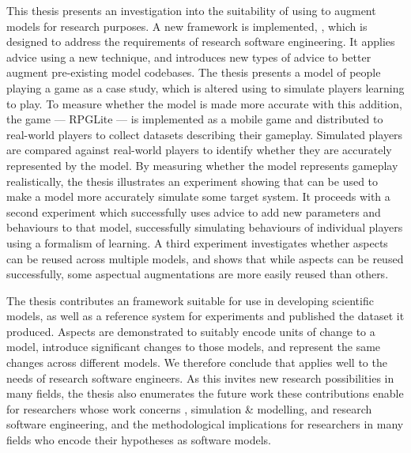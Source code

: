     This thesis presents an investigation into the suitability of using \aop{}
    to augment models for research purposes. A new \aspectorientation{}
    framework is implemented, \pdsf{}, which is designed to address the
    requirements of research software engineering. It applies advice  using a new
    technique, and introduces new types of advice to better augment pre-existing
    model codebases. The thesis presents a model of people playing a game as a
    case study, which is altered using \pdsf{} to simulate players learning to
    play. To measure whether the model is made more accurate with this addition,
    the game --- RPGLite --- is implemented as a mobile game and distributed to
    real-world players to collect datasets describing their gameplay. Simulated
    players are compared against real-world players to identify whether they are
    accurately represented by the model. By measuring whether the model
    represents gameplay realistically, the thesis illustrates an experiment
    showing that \aop{} can be used to make a model more accurately simulate
    some target system. It proceeds with a second experiment which successfully
    uses advice to add new parameters and behaviours to that model, successfully
    simulating behaviours of individual players using a formalism of learning. A
    third experiment investigates whether aspects can be reused across multiple
    models, and shows that while aspects can be reused successfully, some
    aspectual augmentations are more easily reused than others. 
    
    The thesis contributes an \aspectorientation{} framework suitable for use in
    developing scientific models, as well as a reference system for experiments
    and published the dataset it produced. Aspects are demonstrated to suitably
    encode units of change to a model, introduce significant changes to those
    models, and represent the same changes across different models. We therefore
    conclude that \aop{} applies well to the needs of research software
    engineers. As this invites new research possibilities in many fields, the
    thesis also enumerates the future work these contributions enable for
    researchers whose work concerns \aop{}, simulation \& modelling, and
    research software engineering, and the methodological implications for
    researchers in many fields who encode their hypotheses as software models. 
    
    


    




